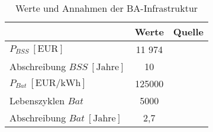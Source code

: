   






\begin{table}[h]
	\begin{center}
    \caption{Werte und Annahmen der BA-Infrastruktur}
	\label{BA_Infrastrukturtab}
	\begin{tabular}{|l|c|c|}
		\hline
		 & \textbf{Werte} & \textbf{Quelle} \\ \hline
		$P_{BSS} ~[\text{EUR}]$ &  11 974  & \cite{guo2020aviation} \\ \hline
      Abschreibung $BSS ~[\text{Jahre}]$&  10  & \cite{salucci2020optimal} \\ \hline
		$P_{Bat} ~[\text{EUR/kWh}]$ & 125000 & \cite{guo2020aviation} \\ \hline
      Lebenszyklen $Bat$ & 5000 & \\ \hline
      Abschreibung $Bat ~[\text{Jahre}]$& 2,7 & \\ \hline

	\end{tabular}
    \end{center}
\end{table}

